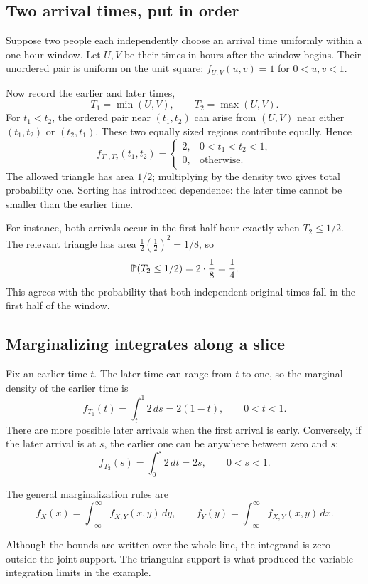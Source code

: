 \subsection{Two arrival times, put in order}

Suppose two people each independently choose an arrival time uniformly
within a one-hour window. Let \(U,V\) be their times in hours after the
window begins. Their unordered pair is uniform on the unit square:
\(f_{U,V}(u,v)=1\) for \(0<u,v<1\).

Now record the earlier and later times,
\[
  T_1=\min(U,V),\qquad T_2=\max(U,V).
\]
For \(t_1<t_2\), the ordered pair near \((t_1,t_2)\) can arise from
\((U,V)\) near either \((t_1,t_2)\) or \((t_2,t_1)\). These two
equally sized regions contribute equally. Hence
\[
  f_{T_1,T_2}(t_1,t_2)=
  \begin{cases}
    2,&0<t_1<t_2<1,\\
    0,&\text{otherwise}.
  \end{cases}
\]
The allowed triangle has area \(1/2\); multiplying by the density two
gives total probability one. Sorting has introduced dependence: the
later time cannot be smaller than the earlier time.

For instance, both arrivals occur in the first half-hour exactly when
\(T_2\le1/2\). The relevant triangle has area
\(\tfrac12(\tfrac12)^2=1/8\), so
\[
  \mathbb{P}(T_2\le1/2)=2\cdot\frac18=\frac14.
\]
This agrees with the probability that both independent original times
fall in the first half of the window.

\subsection{Marginalizing integrates along a slice}

Fix an earlier time \(t\). The later time can range from \(t\) to one,
so the marginal density of the earlier time is
\[
  f_{T_1}(t)=\int_t^1 2\,ds=2(1-t),\qquad 0<t<1.
\]
There are more possible later arrivals when the first arrival is early.
Conversely, if the later arrival is at \(s\), the earlier one can be
anywhere between zero and \(s\):
\[
  f_{T_2}(s)=\int_0^s2\,dt=2s,\qquad 0<s<1.
\]
\begin{result}
The general marginalization rules are
\begin{equation}
  f_X(x)=\int_{-\infty}^{\infty}f_{X,Y}(x,y)\,dy,
  \qquad
  f_Y(y)=\int_{-\infty}^{\infty}f_{X,Y}(x,y)\,dx.
  \label{eq:joint-marginals-continuous}
\end{equation}
\end{result}
Although the bounds are written over the whole line, the integrand is
zero outside the joint support. The triangular support is what produced
the variable integration limits in the example.

